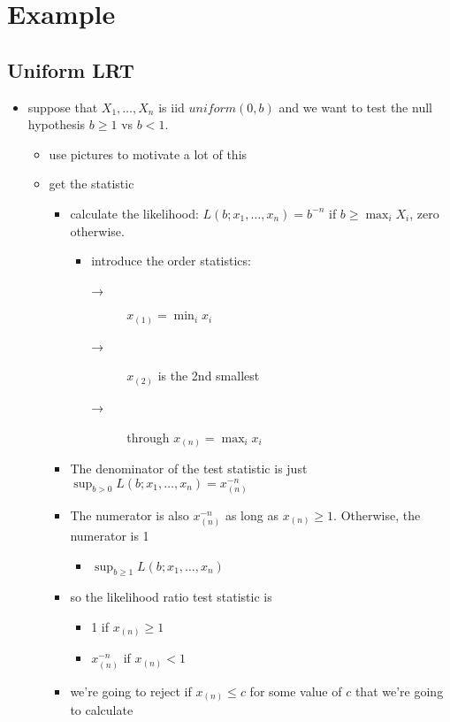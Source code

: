 \section{Example}
\label{sec-2}
\subsection{Uniform LRT}
\label{sec-2-1}

\begin{itemize}
\item suppose that $X_1,\dots,X_n$ is iid $uniform(0,b)$ and we want
      to test the null hypothesis $b \geq 1$ vs $b < 1$.
\begin{itemize}
\item use pictures to motivate a lot of this
\item get the statistic
\begin{itemize}
\item calculate the likelihood: $L(b; x_1,\dots,x_n) = b^{-n}$ if
          $b \geq \max_i X_i$, zero otherwise.
\begin{itemize}
\item introduce the order statistics:
\begin{description}
\item[→] $x_{(1)} = \min_i x_i$
\item[→] $x_{(2)}$ is the 2nd smallest
\item[→] through $x_{(n)} = \max_i x_i$
\end{description}
\end{itemize}
\item The denominator of the test statistic is just $\sup_{b >
          0} L(b; x_1,\dots,x_n) = x_{(n)}^{-n}$
\item The numerator is also $x_{(n)}^{-n}$ as long as $x_{(n)}
          \geq 1$.  Otherwise, the numerator is 1
\begin{itemize}
\item $\sup_{b \geq 1} L(b; x_1,\dots,x_n)$
\end{itemize}
\item so the likelihood ratio test statistic is
\begin{itemize}
\item 1 if $x_{(n)} \geq 1$
\item $x_{(n)}^{-n}$ if $x_{(n)} < 1$
\end{itemize}
\item we're going to reject if $x_{(n)} \leq c$ for some value of
          $c$ that we're going to calculate

\end{itemize}
\end{itemize}
\end{itemize}
